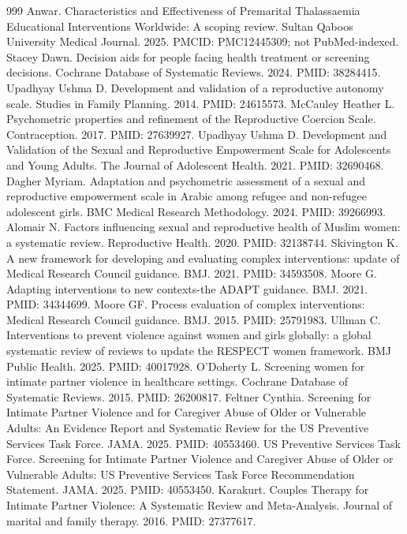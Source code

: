 \documentclass[11pt]{article}
\begin{document}
\begin{thebibliography}{999}
 Anwar. Characteristics and Effectiveness of Premarital Thalassaemia Educational Interventions Worldwide: A scoping review. Sultan Qaboos University Medical Journal. 2025. PMCID: PMC12445309; not PubMed-indexed.
 Stacey Dawn. Decision aids for people facing health treatment or screening decisions. Cochrane Database of Systematic Reviews. 2024. PMID: 38284415.
 Upadhyay Ushma D. Development and validation of a reproductive autonomy scale. Studies in Family Planning. 2014. PMID: 24615573.
 McCauley Heather L. Psychometric properties and refinement of the Reproductive Coercion Scale. Contraception. 2017. PMID: 27639927.
 Upadhyay Ushma D. Development and Validation of the Sexual and Reproductive Empowerment Scale for Adolescents and Young Adults. The Journal of Adolescent Health. 2021. PMID: 32690468.
 Dagher Myriam. Adaptation and psychometric assessment of a sexual and reproductive empowerment scale in Arabic among refugee and non-refugee adolescent girls. BMC Medical Research Methodology. 2024. PMID: 39266993.
 Alomair N. Factors influencing sexual and reproductive health of Muslim women: a systematic review. Reproductive Health. 2020. PMID: 32138744.
 Skivington K. A new framework for developing and evaluating complex interventions: update of Medical Research Council guidance. BMJ. 2021. PMID: 34593508.
 Moore G. Adapting interventions to new contexts-the ADAPT guidance. BMJ. 2021. PMID: 34344699.
 Moore GF. Process evaluation of complex interventions: Medical Research Council guidance. BMJ. 2015. PMID: 25791983.
 Ullman C. Interventions to prevent violence against women and girls globally: a global systematic review of reviews to update the RESPECT women framework. BMJ Public Health. 2025. PMID: 40017928.
 O'Doherty L. Screening women for intimate partner violence in healthcare settings. Cochrane Database of Systematic Reviews. 2015. PMID: 26200817.
 Feltner Cynthia. Screening for Intimate Partner Violence and for Caregiver Abuse of Older or Vulnerable Adults: An Evidence Report and Systematic Review for the US Preventive Services Task Force. JAMA. 2025. PMID: 40553460.
 US Preventive Services Task Force. Screening for Intimate Partner Violence and Caregiver Abuse of Older or Vulnerable Adults: US Preventive Services Task Force Recommendation Statement. JAMA. 2025. PMID: 40553450.
 Karakurt. Couples Therapy for Intimate Partner Violence: A Systematic Review and Meta-Analysis. Journal of marital and family therapy. 2016. PMID: 27377617.

\end{thebibliography}
\end{document}
